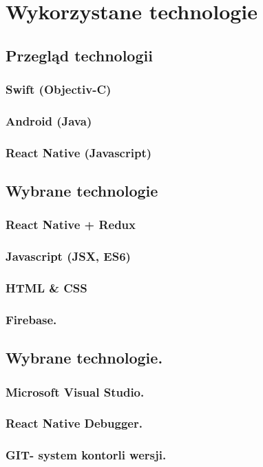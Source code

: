 \chapter[Wykorzystane technologie.]{Wykorzystane technologie}

\section{Przegląd technologii}

\subsection{Swift (Objectiv-C)}
 
\subsection{Android (Java)}
 
\subsection{React Native (Javascript)} 

\section{Wybrane technologie}

\subsection{React Native + Redux}

\subsection{Javascript (JSX, ES6)}

\subsection{HTML  \& CSS}

\subsection{Firebase.}

\section{Wybrane technologie.}

\subsection{Microsoft Visual Studio.}

\subsection{React Native Debugger.}

\subsection{GIT- system kontorli wersji.}